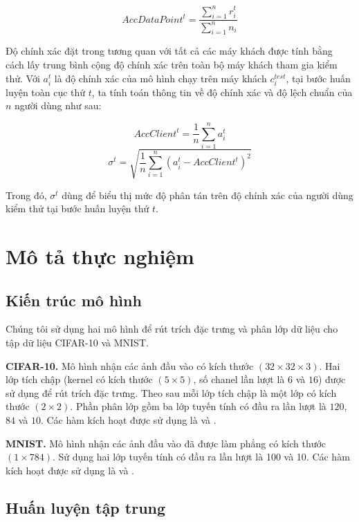 \begin{equation}
    AccDataPoint^t = \frac{\sum_{i=1}^{n} r_i^t}{\sum_{i=1}^{n} n_i}
\end{equation}

Độ chính xác đặt trong tương quan với tất cả các máy khách được tính bằng cách lấy trung bình cộng độ chính xác trên toàn bộ máy khách tham gia kiểm thử. Với $a_i^t$ là độ chính xác của mô hình chạy trên máy khách $c_i^{test}$, tại bước huấn luyện toàn cục thứ $t$, ta tính toán thông tin về độ chính xác và độ lệch chuẩn của $n$ người dùng như sau:

\begin{equation}
    AccClient^t = \frac{1}{n} \sum_{i=1}^n a_i^t
\end{equation}
\begin{equation}
    \sigma^t = \sqrt{\frac{1}{n} \sum_{i=1}^n {(a_i^t - AccClient^t)^2}}
\end{equation}

Trong đó, $\sigma^t$ dùng để biểu thị mức độ phân tán trên độ chính xác của người dùng kiểm thử tại bước huấn luyện thứ $t$.

\section{Mô tả thực nghiệm}

\subsection{Kiến trúc mô hình}
\label{model_schema}

Chúng tôi sử dụng hai mô hình để rút trích đặc trưng và phân lớp dữ liệu cho tập dữ liệu CIFAR-10 và MNIST.

\textbf{CIFAR-10.} Mô hình nhận các ảnh đầu vào có kích thước $(32\times32\times3)$. Hai lớp tích chập (kernel có kích thước $(5\times5)$, số chanel lần lượt là $6$ và $16$) được sử dụng để rút trích đặc trưng. Theo sau mỗi lớp tích chập là một lớp  có kích thước $(2\times2)$. Phần phân lớp gồm ba lớp tuyến tính có đầu ra lần lượt là $120$, $84$ và $10$. Các hàm kích hoạt được sử dụng là  và .

\textbf{MNIST.} Mô hình nhận các ảnh đầu vào đã được làm phẳng có kích thước $(1\times784)$. Sử dụng hai lớp tuyến tính có đầu ra lần lượt là 100 và 10. Các hàm kích hoạt được sử dụng là  và .

\subsection{Huấn luyện tập trung}

